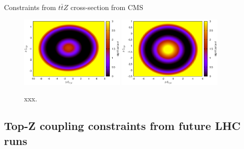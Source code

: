 \documentclass[preprint]{JHEP3} %
\begin{document}
Constraints from $t\bar{t}Z$ cross-section from CMS \\

\begin{figure}[t]
\centering %
\includegraphics[width=0.45\textwidth]{./CMSLO_Delta0.40_0213.eps}
\hfill
\includegraphics[width=0.45\textwidth]{./CMSNLO_Delta0.20_0213.eps}
\caption{\label{fig:v}
xxx.
}
\end{figure}

\subsection{Top-Z coupling constraints from future LHC runs}
\end{document}
